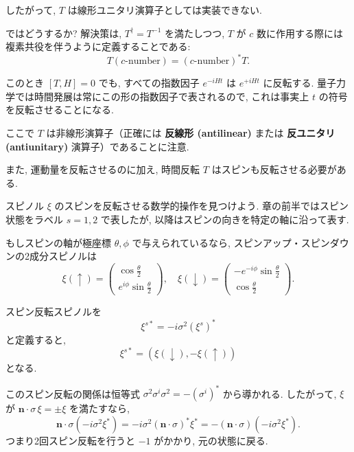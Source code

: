 \documentclass[a4paper,12pt]{article}
\begin{document}
したがって, $T$ は線形ユニタリ演算子としては実装できない.  

ではどうするか?  
解決策は, $T^\dagger=T^{-1}$ を満たしつつ, $T$ が $c$ 数に作用する際には複素共役を伴うように定義することである:
\begin{equation}
T(c\text{-number}) = (c\text{-number})^* T.
\tag{3.133}
\end{equation}

このとき $[T,H]=0$ でも, すべての指数因子 $e^{-iHt}$ は $e^{+iHt}$ に反転する.  
量子力学では時間発展は常にこの形の指数因子で表されるので, これは事実上 $t$ の符号を反転させることになる.  

ここで $T$ は非線形演算子（正確には \textbf{反線形 (antilinear)} または \textbf{反ユニタリ (antiunitary)} 演算子）であることに注意.  

また, 運動量を反転させるのに加え, 時間反転 $T$ はスピンも反転させる必要がある.  

スピノル $\xi$ のスピンを反転させる数学的操作を見つけよう.  
章の前半ではスピン状態をラベル $s=1,2$ で表したが, 以降はスピンの向きを特定の軸に沿って表す.  

もしスピンの軸が極座標 $\theta,\phi$ で与えられているなら, スピンアップ・スピンダウンの2成分スピノルは
\begin{equation*}
\xi(\uparrow)=\begin{pmatrix}\cos \tfrac{\theta}{2} \\ e^{i\phi}\sin\tfrac{\theta}{2}\end{pmatrix}, \quad
\xi(\downarrow)=\begin{pmatrix}-e^{-i\phi}\sin\tfrac{\theta}{2} \\ \cos\tfrac{\theta}{2}\end{pmatrix}.
\end{equation*}

スピン反転スピノルを
\begin{equation}
\xi^{s*} = -i\sigma^2 (\xi^s)^*
\tag{3.134}
\end{equation}
と定義すると,
\begin{equation}
\xi^{s*}=(\xi(\downarrow),-\xi(\uparrow))
\tag{3.135}
\end{equation}
となる.  

このスピン反転の関係は恒等式 $\sigma^2\sigma^i\sigma^2=-(\sigma^i)^*$ から導かれる.  
したがって, $\xi$ が $\mathbf{n}\cdot\sigma \,\xi=\pm\xi$ を満たすなら,
\begin{equation*}
\mathbf{n}\cdot\sigma (-i\sigma^2 \xi^*)=-i\sigma^2(\mathbf{n}\cdot\sigma)^*\xi^*=-(\mathbf{n}\cdot\sigma)(-i\sigma^2\xi^*).
\end{equation*}
つまり2回スピン反転を行うと $-1$ がかかり, 元の状態に戻る.  
\end{document}
